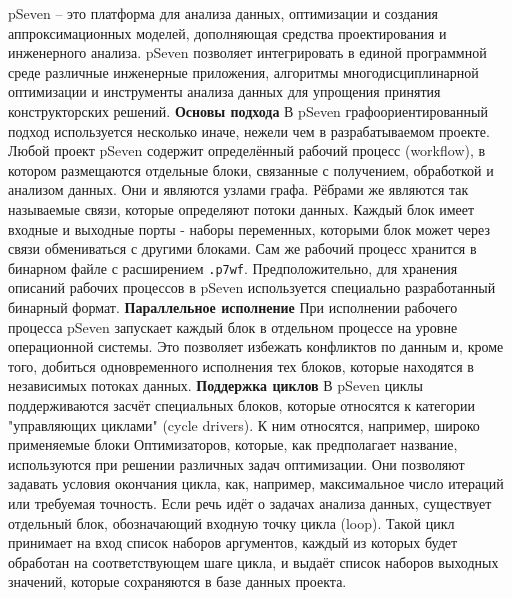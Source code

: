 \def\notedate{2021.11.06}
\def\currentauthor{Тришин И.В. (РК6)}
\> pSeven – это платформа для анализа данных, оптимизации и создания аппроксимационных моделей, 
дополняющая средства проектирования и инженерного анализа. pSeven позволяет интегрировать в единой программной среде различные
инженерные приложения, алгоритмы многодисциплинарной оптимизации и инструменты анализа данных для упрощения принятия 
конструкторских решений.\cite{DatadvanceOffWebsite2021}
\newline
\textbf{Основы подхода}
\> В pSeven графоориентированный подход используется несколько иначе, нежели чем в разрабатываемом проекте.
Любой проект pSeven содержит определённый рабочий процесс (workflow), в котором размещаются отдельные блоки, связанные с получением,
обработкой и анализом данных. Они и являются узлами графа. Рёбрами же являются так называемые связи, которые определяют потоки данных.
Каждый блок имеет входные и выходные порты - наборы переменных, которыми блок может через связи обмениваться с другими блоками. \cite{pSevenDocs2021}
Сам же рабочий процесс хранится в бинарном файле с расширением \texttt{.p7wf}. Предположительно, для хранения описаний рабочих процессов
в pSeven используется специально разработанный бинарный формат.
\newline
\textbf{Параллельное исполнение}
\> При исполнении рабочего процесса pSeven запускает каждый блок в отдельном процессе на уровне операционной системы. \cite{pSevenDocs2021}
Это позволяет избежать конфликтов по данным и, кроме того, добиться одновременного исполнения тех блоков, которые находятся 
в независимых потоках данных.
\newline
\textbf{Поддержка циклов}
\> В pSeven циклы поддерживаются засчёт специальных блоков, которые относятся к категории "управляющих циклами" (cycle drivers).
К ним относятся, например, широко применяемые блоки Оптимизаторов, которые, как предполагает название, используются при решении
различных задач оптимизации. Они позволяют задавать условия окончания цикла, как, например, максимальное число итераций или требуемая
точность. Если речь идёт о задачах анализа данных, существует отдельный блок, обозначающий входную точку цикла (loop). Такой цикл
принимает на вход список наборов аргументов, каждый из которых будет обработан на соответствующем шаге цикла, и выдаёт список наборов
выходных значений, которые сохраняются в базе данных проекта. 
